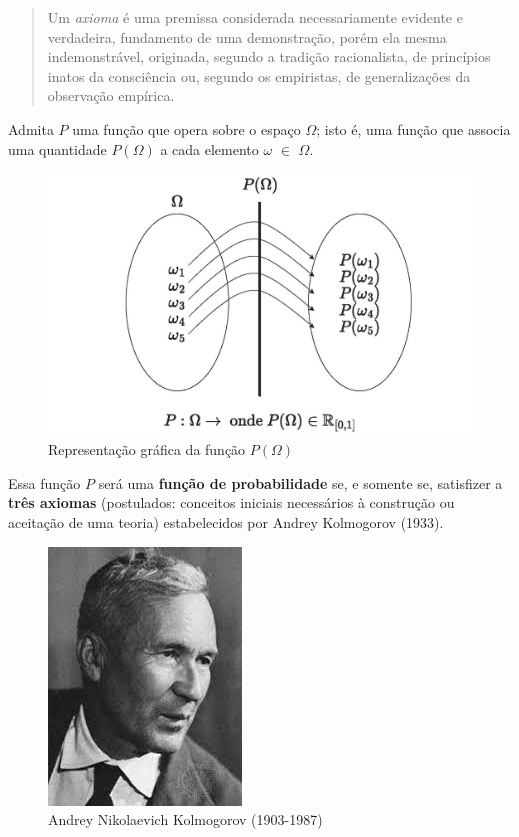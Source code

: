 \documentclass[
]{book}
\begin{document}
\begin{quote}
Um \emph{axioma} é uma premissa considerada necessariamente evidente e verdadeira, fundamento de uma demonstração, porém ela mesma indemonstrável, originada, segundo a tradição racionalista, de princípios inatos da consciência ou, segundo os empiristas, de generalizações da observação empírica.
\end{quote}

\hfill\break

Admita \(P\) uma função que opera sobre o espaço \(\Omega\); isto é, uma função que associa uma quantidade \(P(\Omega)\) a cada elemento \(\omega\) \(\in\) \(\Omega\).

\hfill\break

\begin{figure}

{\centering \includegraphics[width=0.8\linewidth]{images4/funcao_probabilidade} 

}

\caption{Representação gráfica da função $P(\Omega)$}\label{fig:unnamed-chunk-61}
\end{figure}

\hfill\break

Essa função \(P\) será uma \textbf{função de probabilidade} se, e somente se, satisfizer a \textbf{três axiomas} (postulados: conceitos iniciais necessários à construção ou aceitação de uma teoria) estabelecidos por Andrey Kolmogorov (1933).

\hfill\break

\begin{figure}

{\centering \includegraphics[width=0.4\linewidth]{images4/kolmogorov} 

}

\caption{Andrey Nikolaevich Kolmogorov  (1903-1987)}\label{fig:unnamed-chunk-62}
\end{figure}
\end{document}
